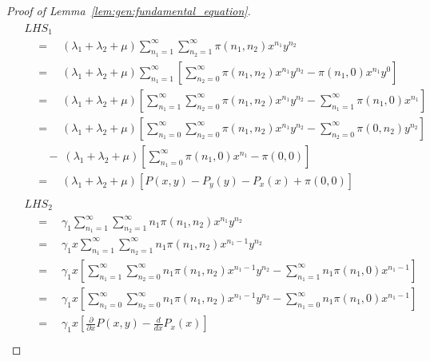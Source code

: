 \begin{proof}[Proof of Lemma~\ref{lem:gen:fundamental_equation}]
\begin{align*}
        \begin{split}
            & LHS_1 \\
            & \quad = \quad (\lambda_1 + \lambda_2 + \mu) \sum_{n_1=1}^{\infty} \sum_{n_2=1}^{\infty} \pi(n_1,n_2)x^{n_1}y^{n_2} \\
            & \quad = \quad (\lambda_1 + \lambda_2 + \mu) \sum_{n_1=1}^{\infty} \left[ \sum_{n_2=0}^{\infty} \pi(n_1,n_2) x^{n_1}y^{n_2} - \pi(n_1,0) x^{n_1} y^0 \right] \\
            & \quad = \quad (\lambda_1 + \lambda_2 + \mu) \left[
                \sum_{n_1=1}^{\infty} \sum_{n_2=0}^{\infty} \pi(n_1,n_2) x^{n_1}y^{n_2}
                - \sum_{n_1=1}^{\infty} \pi(n_1,0) x^{n_1}
            \right] \\
            & \quad = \quad (\lambda_1 + \lambda_2 + \mu) \left[
                \sum_{n_1=0}^{\infty} \sum_{n_2=0}^{\infty} \pi(n_1,n_2) x^{n_1}y^{n_2}
                - \sum_{n_2=0}^{\infty} \pi(0,n_2) y^{n_2}
            \right] \\
            & \quad \quad - \; (\lambda_1 + \lambda_2 + \mu) \left[
                \sum_{n_1=0}^{\infty} \pi(n_1,0) x^{n_1} - \pi(0,0)
            \right] \\
            & \quad = \quad (\lambda_1 + \lambda_2 + \mu) \left[ P(x,y) - P_y(y) - P_x(x) + \pi(0,0) \right]
        \end{split} \\
        \begin{split}
            & LHS_2 \\
            & \quad = \quad \gamma_1 \sum_{n_1=1}^{\infty} \sum_{n_2=1}^{\infty} n_1 \pi(n_1,n_2) x^{n_1} y^{n_2} \\
            & \quad = \quad \gamma_1 x \sum_{n_1=1}^{\infty} \sum_{n_2=1}^{\infty} n_1 \pi(n_1,n_2) x^{n_1-1} y^{n_2} \\
            & \quad = \quad \gamma_1 x \left[
                \sum_{n_1=1}^{\infty} \sum_{n_2=0}^{\infty} n_1 \pi(n_1,n_2) x^{n_1-1} y^{n_2}
                - \sum_{n_1=1}^{\infty} n_1 \pi(n_1,0) x^{n_1-1}
            \right] \\
            & \quad = \quad \gamma_1 x \left[
                \sum_{n_1=0}^{\infty} \sum_{n_2=0}^{\infty} n_1 \pi(n_1,n_2) x^{n_1-1} y^{n_2}
                - \sum_{n_1=0}^{\infty} n_1 \pi(n_1,0) x^{n_1-1}
            \right] \\
            & \quad = \quad \gamma_1 x \left[
                \frac{\partial}{\partial x} P(x,y) - \frac{d}{dx} P_x(x)
            \right]
        \end{split} \\

\end{align*}
\end{proof}
